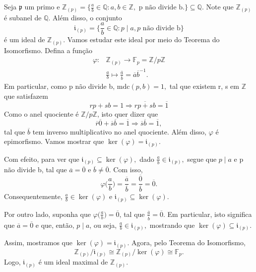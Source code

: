 \documentclass[algebraII_notes.tex]{subfiles}
\begin{document}
\begin{example}
	Seja \(\mathfrak{p}\) um primo e \(\mathbb{Z}_{(p)} = \biggl\{\frac{a}{b}\in \mathbb{Q}:a, b\in \mathbb{Z}, \text{ p não divide b.}\biggr\} \subseteq \mathbb{Q}\).
	Note que \(\mathbb{Z}_{(p)}\) é subanel de \(\mathbb{Q}.\) Além disso, o conjunto
	\[
		\mathfrak{i}_{(p)}=\biggl\{\frac{a}{b}\in \mathbb{Q}: p\mid a, p \text{ não divide b}\biggr\}
	\]
	é um ideal de \(\mathbb{Z}_{(p)}\). Vamos estudar este ideal por meio do Teorema do Isomorfismo. Defina a função
	\begin{align*}
		\varphi : & \mathbb{Z}_{(p)}\rightarrow \mathbb{F}_{p} = \mathbb{Z}/p \mathbb{Z}                  \\
		          & \frac{a}{b}\mapsto \frac{\overline{a}}{\overline{b}} = \overline{a}\overline{b}^{-1}.
	\end{align*}
	Em particular, como p não divide b, \(\mathrm{mdc}(p, b) = 1,\) tal que existem r, s em \(\mathbb{Z}\) que satisfazem
	\[
		rp + sb = 1 \Rightarrow \overline{rp + sb} = \overline{1}
	\]
	Como o anel quociente é \(\mathbb{Z}/p \mathbb{Z}\), isto quer dizer que
	\[
		\overline{r}\overline{0} + \overline{s}\overline{b} = \overline{1} \Rightarrow \overline{s}\overline{b} = \overline{1},
	\]
	tal que \(\overline{b}\) tem inverso multiplicativo no anel quociente. Além disso, \(\varphi \) é epimorfismo. Vamos mostrar que
	\(\ker{(\varphi )} = \mathfrak{i}_{(p)}.\)

	Com efeito, para ver que \(\mathfrak{i}_{(p)}\subseteq \ker{(\varphi )},\) dado \(\frac{a}{b}\in \mathfrak{i}_{(p)},\) segue que \(p\mid a\) e p não divide b, tal que
	\(\overline{a} = \overline{0}\) e \(\overline{b}\neq \overline{0}.\) Com isso,
	\[
		\varphi \biggl(\frac{a}{b}\biggr) = \frac{\overline{a}}{\overline{b}} = \frac{\overline{0}}{\overline{b}} = \overline{0}.
	\]
	Consequentemente, \(\frac{a}{b}\in \ker{(\varphi )}\) e \(\mathfrak{i}_{(p)}\subseteq \ker{(\varphi )}\).

	Por outro lado, suponha que \(\varphi \biggl(\frac{a}{b}\biggr)=\overline{0}\), tal que \(\frac{\overline{a}}{\overline{b}} = \overline{0}\). Em particular, isto significa que
	\(\overline{a} = \overline{0}\) e que, então, \(p\mid a\), ou seja, \(\frac{a}{b}\in \mathfrak{i}_{(p)},\) mostrando que \(\ker{(\varphi )}\subseteq \mathfrak{i}_(p)\).

	Assim, mostramos que \(\ker{(\varphi )} = \mathfrak{i}_{(p)}.\) Agora, pelo Teorema do Isomorfismo,
	\[
		\mathbb{Z}_{(p)}/\mathfrak{i}_{(p)} \cong{\mathbb{Z}_{(p)}/\ker{(\varphi )}} \cong{\mathbb{F}_{p}}.
	\]
	Logo, \(\mathfrak{i}_{(p)}\) é um ideal maximal de \(\mathbb{Z}_{(p)}\).


\end{example}
\end{document}
